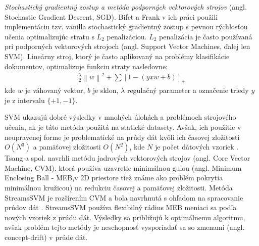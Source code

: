 \textit{Stochastický gradientný zostup a metóda podporných vektorových strojov} (angl. Stochastic Gradient Descent, SGD). Bifet a Frank v ich práci použili implementáciu tzv. vanilla stochastický gradientný zostup s pevnou rýchlosťou učenia optimalizujúc stratu s $L_2$ penalizáciou. $L_2$ penalizácia je často používaná pri podporných vektorových strojoch (angl. Support Vector Machines, ďalej len SVM). Lineárny stroj, ktorý je často aplikovaný na problémy klasifikácie dokumentov, optimalizuje funkciu straty nasledovne:
\begin{align*}
\frac{\lambda }{2}\left \| w \right \|^{2}+\sum [1-(yxw + b)]_{+}
\end{align*}
kde $w$ je váhovaný vektor, $b$ je sklon, $\lambda$ regulačný parameter a označenie triedy $y$ je z intervalu $\{+1, -1\}$.
\par
SVM ukazujú dobré výsledky v mnohých úlohách a problémoch strojového učenia, ak je táto metóda použitá na statické datasety. Avšak, ich použitie v neupravenej forme je problematické na prúdy dát kvôli ich časovej zložitosti $O(N^3)$ a pamäťovej zložitosti $O(N^2)$, kde $N$ je počet dátových vzoriek \citep{nguyen2015survey}. Tsang a spol. navrhli metódu jadrových vektorových strojov (angl. Core Vector Machine, CVM), ktorá používa uzavretie minimálnou guľou (angl. Minimum Enclosing Ball - MEB,v 2D priestore tiež známe ako problém pokrytia minimálnou kružicou) na redukciu časovej a pamäťovej zložitosti. Metóda StreamsSVM je rozšírením CVM a bola navrhnutá s ohľadom na spracovanie prúdov dát \citep{rai2009streamed}. StreamsSVM používa flexibilný rádius MEB meniaci sa podľa nových vzoriek z prúdu dát. Výsledky sa približujú k optimálnemu algoritmu, avšak problém tejto metódy je neschopnosť vysporiadať sa so zmenami (angl. concept-drift) v prúde dát.



